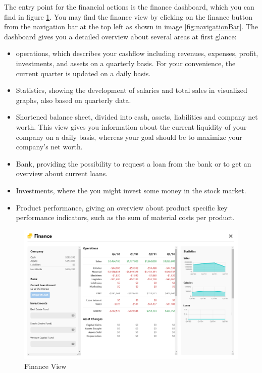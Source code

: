  The entry point for the financial actions is the finance dashboard, which you can find in figure \ref{fig:finance_view}. You may find the finance view by clicking on the finance button from the navigation bar at the top left as shown in image \ref{fig:navigationBar}. The dashboard gives you a detailed overview about several areas at first glance:
\begin{itemize}
    \item operations, which describes your cashflow including revenues, expenses, profit, investments, and assets on a quarterly basis. For your convenience, the current quarter is updated on a daily basis.
    \item Statistics, showing the development of salaries and total sales in visualized graphs, also based on quarterly data.
    \item Shortened balance sheet, divided into cash, assets, liabilities and company net worth. This view gives you information about the current liquidity of your company on a daily basis, whereas your goal should be to maximize your company's net worth.
    \item Bank, providing the possibility to request a loan from the bank or to get an overview about current loans.
    \item Investments, where the you might invest some money in the stock market.
    \item Product performance, giving an overview about product specific key performance indicators, such as the sum of material costs per product.
\end{itemize}
\begin{figure}
    \centering
    \includegraphics [width=\textwidth]{images/financeView.png}
    \caption{Finance View}
    \label{fig:finance_view}
\end{figure}

